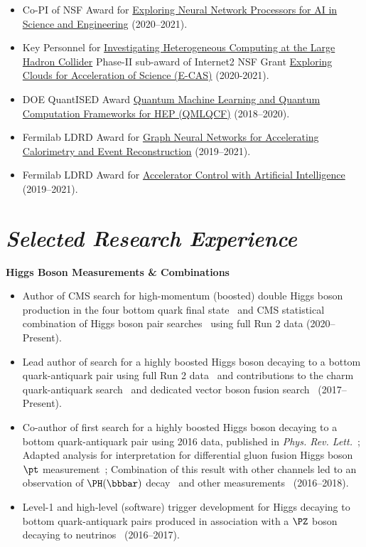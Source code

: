 \documentclass[11pt]{res}
\newcommand{\MarginText}[1]{\section{\textit{#1}}}
\begin{document}
\begin{resume}
\begin{itemize}
    \item Co-PI of NSF Award for \href{https://nsf.gov/awardsearch/showAward?AWD_ID=2005369}{Exploring Neural Network Processors for AI in Science and Engineering} ({2020--2021}).
    \item Key Personnel for \href{https://www.internet2.edu/news/detail/17957/}{Investigating Heterogeneous Computing at the Large Hadron Collider} Phase-II sub-award of Internet2 NSF Grant \href{https://www.nsf.gov/awardsearch/showAward?AWD_ID=1904444}{Exploring Clouds for Acceleration of Science (E-CAS)} ({2020-2021}).
    \item DOE QuantISED Award \href{https://pamspublic.science.energy.gov/WebPAMSExternal/Interface/Common/ViewPublicAbstract.aspx?rv=1f7d4729-6f93-40bd-a55f-c108545b1ea9&rtc=24&PRoleId=10}{Quantum Machine Learning and Quantum Computation Frameworks for HEP (QMLQCF)} ({2018--2020}).
    \item Fermilab LDRD Award for \href{https://ldrd.fnal.gov/subdir/FNAL-LDRD-2019-017-D1.pdf}{Graph Neural Networks for Accelerating Calorimetry and Event Reconstruction} ({2019--2021}).
    \item Fermilab LDRD Award for \href{https://ldrd.fnal.gov/subdir/FNAL-LDRD-2019-027-D1.pdf}{Accelerator Control with Artificial Intelligence} ({2019--2021}).
  \end{itemize}

  \MarginText{Selected Research Experience}

  \textbf{Higgs Boson Measurements \& Combinations}
  \begin{itemize}
    \itemsep-0.3em
    \item Author of CMS search for high-momentum (boosted) double Higgs boson production in the four bottom quark final state~\cite{CMS:2022nmn} and CMS statistical combination of Higgs boson pair searches~\cite{CMS:2022dwd} using full Run 2 data ({2020--Present}).
    \item Lead author of search for a highly boosted Higgs boson decaying to a bottom quark-antiquark pair using full Run 2 data~\cite{Sirunyan:2020hwz} and contributions to the charm quark-antiquark search~\cite{CMS:2022wqf} and dedicated vector boson fusion search~\cite{CMS:2024ddc} ({2017--Present}).
    \item Co-author of first search for a highly boosted Higgs boson decaying to a bottom quark-antiquark pair using 2016 data, published in \emph{Phys. Rev. Lett.}~\cite{Sirunyan:2017dgc}; Adapted analysis for interpretation for differential gluon fusion Higgs boson $\pt$ measurement~\cite{Sirunyan:2018sgc}; Combination of this result with other channels led to an observation of $\PH(\bbbar)$ decay~\cite{Sirunyan:2018kst} and other measurements~\cite{Sirunyan:2018koj} ({2016--2018}).
    \item Level-1 and high-level (software) trigger development for Higgs decaying to bottom quark-antiquark pairs produced in association with a $\PZ$ boson decaying to neutrinos~\cite{Sirunyan:2018kst} ({2016--2017}).
  \end{itemize}


\end{resume}
\end{document}
